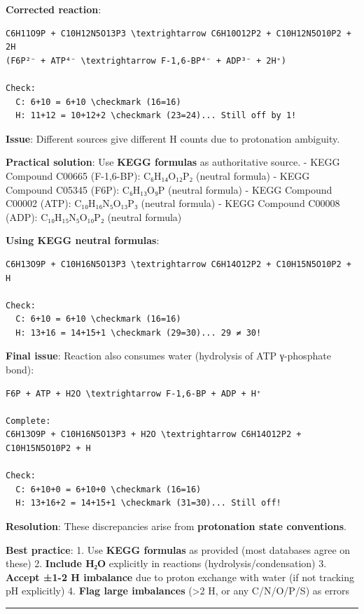\textbf{Corrected reaction}:

\begin{lstlisting}
C6H11O9P + C10H12N5O13P3 \textrightarrow C6H10O12P2 + C10H12N5O10P2 + 2H
(F6P²⁻ + ATP⁴⁻ \textrightarrow F-1,6-BP⁴⁻ + ADP³⁻ + 2H⁺)

Check:
  C: 6+10 = 6+10 \checkmark (16=16)
  H: 11+12 = 10+12+2 \checkmark (23=24)... Still off by 1!
\end{lstlisting}

\textbf{Issue}: Different sources give different H counts due to
protonation ambiguity.

\textbf{Practical solution}: Use \textbf{KEGG formulas} as authoritative
source. - KEGG Compound C00665 (F-1,6-BP): C₆H₁₄O₁₂P₂ (neutral formula)
- KEGG Compound C05345 (F6P): C₆H₁₃O₉P (neutral formula) - KEGG Compound
C00002 (ATP): C₁₀H₁₆N₅O₁₃P₃ (neutral formula) - KEGG Compound C00008
(ADP): C₁₀H₁₅N₅O₁₀P₂ (neutral formula)

\textbf{Using KEGG neutral formulas}:

\begin{lstlisting}
C6H13O9P + C10H16N5O13P3 \textrightarrow C6H14O12P2 + C10H15N5O10P2 + H

Check:
  C: 6+10 = 6+10 \checkmark (16=16)
  H: 13+16 = 14+15+1 \checkmark (29=30)... 29 ≠ 30!
\end{lstlisting}

\textbf{Final issue}: Reaction also consumes water (hydrolysis of ATP
γ-phosphate bond):

\begin{lstlisting}
F6P + ATP + H2O \textrightarrow F-1,6-BP + ADP + H⁺

Complete:
C6H13O9P + C10H16N5O13P3 + H2O \textrightarrow C6H14O12P2 + C10H15N5O10P2 + H

Check:
  C: 6+10+0 = 6+10+0 \checkmark (16=16)
  H: 13+16+2 = 14+15+1 \checkmark (31=30)... Still off!
\end{lstlisting}

\textbf{Resolution}: These discrepancies arise from \textbf{protonation
state conventions}.

\textbf{Best practice}: 1. Use \textbf{KEGG formulas} as provided (most
databases agree on these) 2. \textbf{Include H₂O} explicitly in
reactions (hydrolysis/condensation) 3. \textbf{Accept ±1-2 H imbalance}
due to proton exchange with water (if not tracking pH explicitly) 4.
\textbf{Flag large imbalances} (\textgreater2 H, or any C/N/O/P/S) as
errors

\begin{center}\rule{0.5\linewidth}{0.5pt}\end{center}

